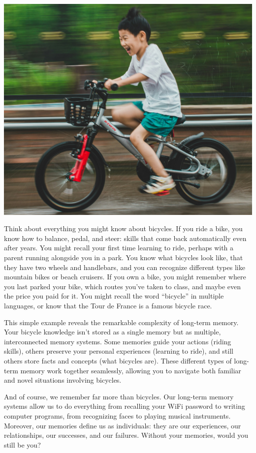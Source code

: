 \documentclass[
]{krantz}
\begin{document}
\begin{center}\includegraphics[width=1\linewidth]{images/ch5/bike} \end{center}

Think about everything you might know about bicycles. If you ride a bike, you know how to balance, pedal, and steer: skills that come back automatically even after years. You might recall your first time learning to ride, perhaps with a parent running alongside you in a park. You know what bicycles look like, that they have two wheels and handlebars, and you can recognize different types like mountain bikes or beach cruisers. If you own a bike, you might remember where you last parked your bike, which routes you've taken to class, and maybe even the price you paid for it. You might recall the word ``bicycle'' in multiple languages, or know that the Tour de France is a famous bicycle race.

This simple example reveals the remarkable complexity of long-term memory. Your bicycle knowledge isn't stored as a single memory but as multiple, interconnected memory systems. Some memories guide your actions (riding skills), others preserve your personal experiences (learning to ride), and still others store facts and concepts (what bicycles are). These different types of long-term memory work together seamlessly, allowing you to navigate both familiar and novel situations involving bicycles.

And of course, we remember far more than bicycles. Our long-term memory systems allow us to do everything from recalling your WiFi password to writing computer programs, from recognizing faces to playing musical instruments. Moreover, our memories define us as individuals: they are our experiences, our relationships, our successes, and our failures. Without your memories, would you still be you?
\end{document}
